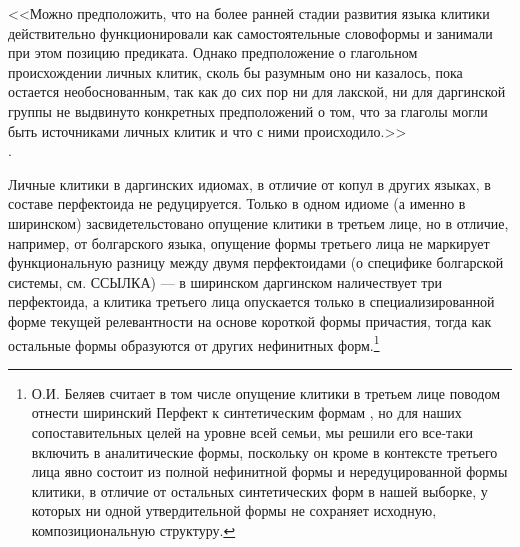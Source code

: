 \begin{displayquote}
<<Можно предположить, что на более ранней стадии развития языка клитики действительно функционировали как самостоятельные словоформы и занимали при этом позицию предиката. Однако предположение о глагольном происхождении личных клитик, сколь бы разумным оно ни казалось, пока остается необоснованным, так как до сих пор ни для лакской, ни для даргинской группы не выдвинуто конкретных предположений о том, что за глаголы могли быть источниками личных клитик и что с ними происходило.>>\\
\citep[586]{sumbatovalander2014}.
\end{displayquote}

Личные клитики в даргинских идиомах, в отличие от копул в других языках, в составе перфектоида не редуцируется. Только в одном идиоме (а именно в ширинском) засвидетельстовано опущение клитики в третьем лице, но в отличие, например, от болгарского языка, опущение формы третьего лица не маркирует функциональную разницу между двумя перфектоидами (о специфике болгарской системы, см. ССЫЛКА) --- в ширинском даргинском наличествует три перфектоида, а клитика третьего лица опускается только в специализированной форме текущей релевантности на основе короткой формы причастия, тогда как остальные формы образуются от других нефинитных форм.\footnote{О.И. Беляев считает в том числе опущение клитики в третьем лице поводом отнести ширинский Перфект к синтетическим формам \citep[95]{belyaev2018}, но для наших сопоставительных целей на уровне всей семьи, мы решили его все-таки включить в аналитические формы, поскольку он кроме в контексте третьего лица явно состоит из полной нефинитной формы и нередуцированной формы клитики, в отличие от остальных синтетических форм в нашей выборке, у которых ни одной утвердительной формы не сохраняет исходную, композициональную структуру.}

